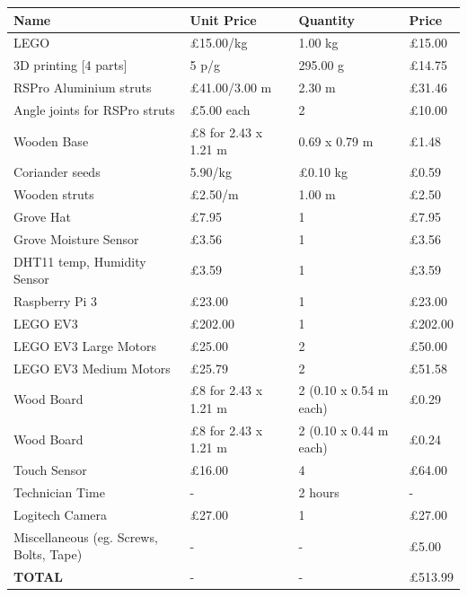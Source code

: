 \documentclass{article}
\begin{document}
{\footnotesize
\begin{tabular}{ |p{2.8cm}|p{1.6cm}|p{1cm}|p{0.9cm}|  }
\hline


\hline
\textbf{Name}& \textbf{Unit Price} &\textbf{Quantity} & \textbf{Price} \\
\hline
LEGO & £15.00/kg &1.00 kg &£15.00 \\
\hline
3D printing [4 parts] & 5 p/g   & 295.00 g & £14.75 \\
\hline
RSPro Aluminium struts &£41.00/3.00 m & 2.30 m & £31.46 \\
\hline
Angle joints for RSPro struts    &£5.00 each & 2 & £10.00 \\
\hline
Wooden Base & £8 for 2.43 x 1.21 m & 0.69 x 0.79 m & £1.48\\
\hline
Coriander seeds & 5.90/kg & £0.10 kg &£0.59   \\
\hline
Wooden struts & £2.50/m & 1.00 m & £2.50 \\
\hline
Grove Hat & £7.95& 1& £7.95 \\
\hline
Grove Moisture Sensor & £3.56 & 1 &£3.56 \\
\hline
DHT11 temp, Humidity Sensor & £3.59 & 1 & £3.59 \\
\hline
Raspberry Pi 3 & £23.00 & 1 & £23.00 \\
\hline
LEGO EV3 & £202.00 & 1 & £202.00 \\
\hline
LEGO EV3 Large Motors & £25.00 & 2 & £50.00 \\
\hline
LEGO EV3 Medium Motors & £25.79 & 2 & £51.58\\
\hline
Wood Board  & £8 for 2.43 x 1.21 m & 2 (0.10 x 0.54 m each) & £0.29\\
\hline
Wood Board & £8 for 2.43 x 1.21 m & 2 (0.10 x 0.44 m each) & £0.24 \\
\hline
Touch Sensor & £16.00 &4 & £64.00 \\
\hline
Technician Time & - &2 hours & - \\
\hline
Logitech Camera &£27.00  &1 & £27.00 \\
\hline
Miscellaneous (eg. Screws, Bolts, Tape) & - & - & £5.00 \\
\hline
\textbf{TOTAL}  & - & - & £513.99 \\
\hline
\end{tabular}
}





\end{document}
